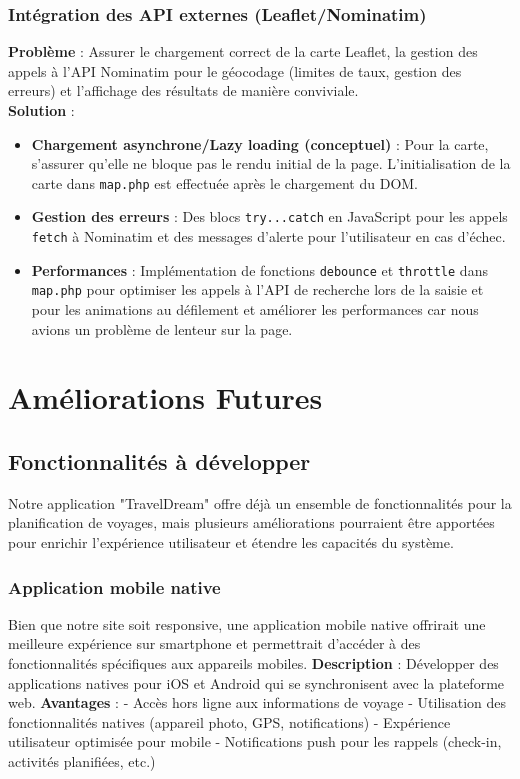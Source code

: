 \documentclass[a4paper,12pt]{article}
\begin{document}
\subsubsection{Intégration des API externes (Leaflet/Nominatim)}
\textbf{Problème} : Assurer le chargement correct de la carte Leaflet, la gestion des appels à l'API Nominatim pour le géocodage (limites de taux, gestion des erreurs) et l'affichage des résultats de manière conviviale. \\
\textbf{Solution} :
\begin{itemize}
    \item \textbf{Chargement asynchrone/Lazy loading (conceptuel)} : Pour la carte, s'assurer qu'elle ne bloque pas le rendu initial de la page. L'initialisation de la carte dans \texttt{map.php} est effectuée après le chargement du DOM.
    \item \textbf{Gestion des erreurs} : Des blocs \texttt{try...catch} en JavaScript pour les appels \texttt{fetch} à Nominatim et des messages d'alerte pour l'utilisateur en cas d'échec.
    \item \textbf{Performances} : Implémentation de fonctions \texttt{debounce} et \texttt{throttle} dans \texttt{map.php} pour optimiser les appels à l'API de recherche lors de la saisie et pour les animations au défilement et améliorer les performances car nous avions un problème de lenteur sur la page.
\end{itemize}

\section{Améliorations Futures}

\subsection{Fonctionnalités à développer}
Notre application "TravelDream" offre déjà un ensemble de fonctionnalités pour la planification de voyages, mais plusieurs améliorations pourraient être apportées pour enrichir l'expérience utilisateur et étendre les capacités du système.

\subsubsection{Application mobile native}
Bien que notre site soit responsive, une application mobile native offrirait une meilleure expérience sur smartphone et permettrait d'accéder à des fonctionnalités spécifiques aux appareils mobiles.
\textbf {Description} : Développer des applications natives pour iOS et Android qui se synchronisent avec la plateforme web.
\textbf {Avantages }: - Accès hors ligne aux informations de voyage - Utilisation des fonctionnalités natives (appareil photo, GPS, notifications) - Expérience utilisateur optimisée pour mobile - Notifications push pour les rappels (check-in, activités planifiées, etc.)
\end{document}
